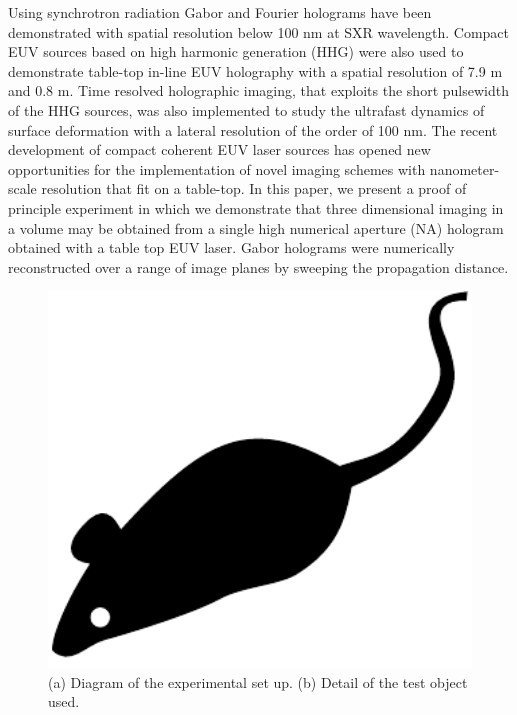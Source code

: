 \documentclass[]{IEEEphot}
\begin{document}
Using synchrotron radiation Gabor and Fourier holograms have been demonstrated with spatial resolution below 100 nm at SXR wavelength.  Compact EUV sources based on high harmonic generation (HHG) were also used to demonstrate table-top in-line EUV holography with a spatial resolution of 7.9 m and 0.8 m.  Time resolved holographic imaging, that exploits the short pulsewidth of the HHG sources, was also implemented to study the ultrafast dynamics of surface deformation with a lateral resolution of the order of 100 nm.  The recent development of compact coherent EUV laser sources has opened new opportunities for the implementation of novel imaging schemes with nanometer-scale resolution that fit on a table-top. In this paper, we present a proof of principle experiment in which we demonstrate that three dimensional imaging in a volume may be obtained from a single high numerical  aperture (NA) hologram obtained with a table top EUV laser. Gabor holograms were numerically reconstructed over a range of image planes by sweeping the propagation distance. 

\begin{figure}[t]
\centering
\includegraphics[width=30pc]{mouse}
\caption{(a) Diagram of the experimental set up. (b) Detail of the test object used.}
\label{fig_env1}
\end{figure}
\end{document}
